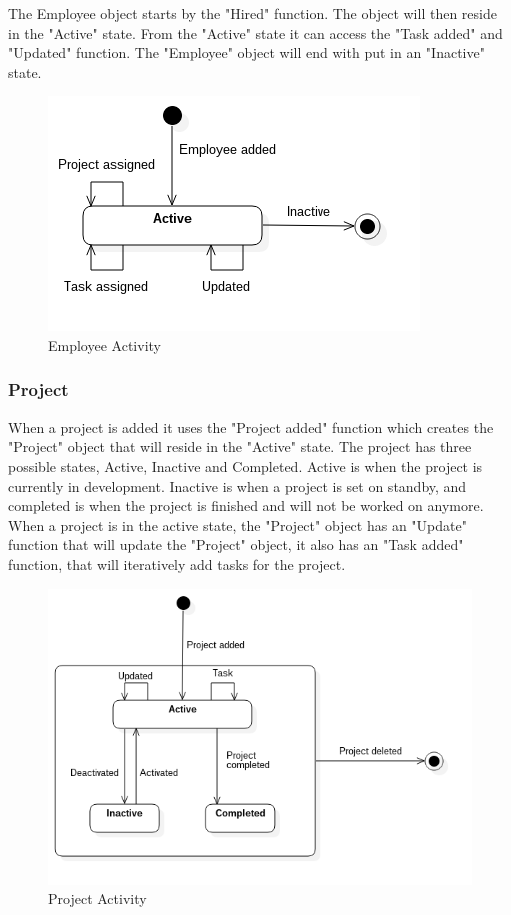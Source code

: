 The Employee object starts by the "Hired" function. The object will then reside in the "Active" state. From the "Active" state it can access the "Task added" and "Updated" function. The "Employee" object will end with put in an "Inactive" state. %

\begin{figure}[H]
    \centering
    \includegraphics[scale=0.6]{Images/ProblemDomain/employeeActivityDiagram.png}
    \caption{Employee Activity}
    \label{fig:employeeActivityDiagram}
\end{figure}

\subsubsection*{Project}

When a project is added it uses the "Project added" function which creates the "Project" object that will reside in the "Active" state. The project has three possible states, Active, Inactive and Completed. Active is when the project is currently in development. Inactive is when a project is set on standby, and completed is when the project is finished and will not be worked on anymore. When a project is in the active state, the "Project" object has an "Update" function that will update the "Project" object, it also has an "Task added" function, that will iteratively add tasks for the project. 

\begin{figure}[H]
    \centering
    \includegraphics[scale=0.6]{Images/ProblemDomain/projectActivityDiagram.png}
    \caption{Project Activity}
    \label{fig:projectActivityDiagram}
\end{figure}

